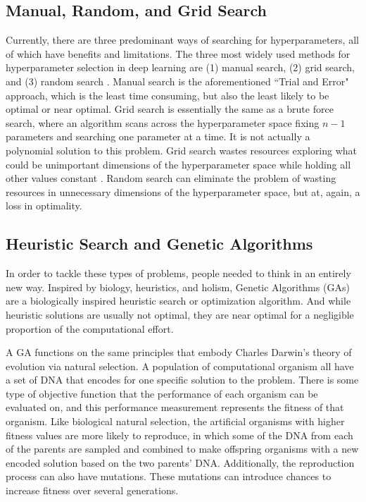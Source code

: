 \documentclass[12pt]{report}
\begin{document}
\subsection{Manual, Random, and Grid Search}
Currently, there are three predominant ways of searching for hyperparameters, all of which have benefits and limitations. The three most widely used methods for hyperparameter selection in deep learning are (1) manual search, (2) grid search, and (3) random search \cite{young2015optimizing, bergstra2012random}. Manual search is the aforementioned ``Trial and Error" approach, which is the least time consuming, but also the least likely to be optimal or near optimal. Grid search is essentially the same as a brute force search, where an algorithm scans across the hyperparameter space fixing $n-1$ parameters and searching one parameter at a time. It is not actually a polynomial solution to this problem. Grid search wastes resources exploring what could be unimportant dimensions of the hyperparameter space while holding all other values constant \cite{young2015optimizing}. Random search can eliminate the problem of wasting resources in unnecessary dimensions of the hyperparameter space, but at, again, a loss in optimality.

\subsection{Heuristic Search and Genetic Algorithms}
In order to tackle these types of problems, people needed to think in an entirely new way. Inspired by biology, heuristics, and holism, Genetic Algorithms (GAs) are a biologically inspired heuristic search or optimization algorithm. And while heuristic solutions are usually not optimal, they are near optimal for a negligible proportion of the computational effort.

A GA functions on the same principles that embody Charles Darwin's theory of evolution via natural selection. A population of computational organism all have a set of DNA that encodes for one specific solution to the problem. There is some type of objective function that the performance of each organism can be evaluated on, and this performance measurement represents the fitness of that organism. Like biological natural selection, the artificial organisms with higher fitness values are more likely to reproduce, in which some of the DNA from each of the parents are sampled and combined to make offspring organisms with a new encoded solution based on the two parents' DNA. Additionally, the reproduction process can also have mutations. These mutations can introduce chances to increase fitness over several generations.
\end{document}
